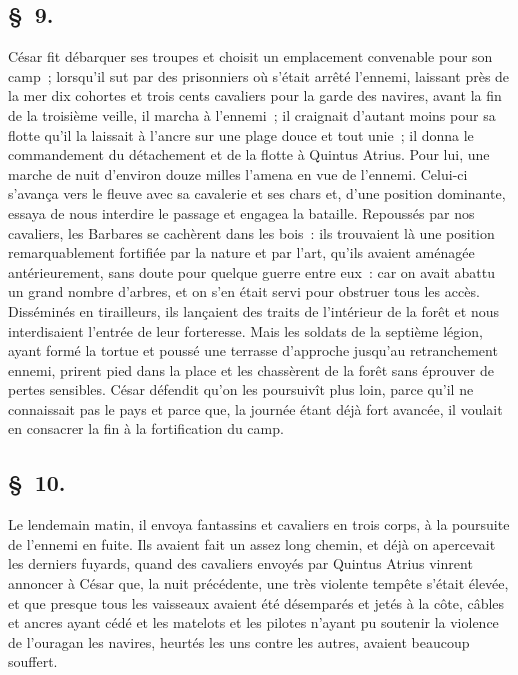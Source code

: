 \documentclass[french,twoside]{book} %
\begin{document}
\subsection[{§ 9.}]{ \textsc{§ 9.} }
\noindent César fit débarquer ses troupes et choisit un emplacement convenable pour son camp ; lorsqu’il sut par des prisonniers où s’était arrêté l’ennemi, laissant près de la mer dix cohortes et trois cents cavaliers pour la garde des navires, avant la fin de la troisième veille, il marcha à l’ennemi ; il craignait d’autant moins pour sa flotte qu’il la laissait à l’ancre sur une plage douce et tout unie ; il donna le commandement du détachement et de la flotte à Quintus Atrius. Pour lui, une marche de nuit d’environ douze milles l’amena en vue de l’ennemi. Celui-ci s’avança vers le fleuve avec sa cavalerie et ses chars et, d’une position dominante, essaya de nous interdire le passage et engagea la bataille. Repoussés par nos cavaliers, les Barbares se cachèrent dans les bois : ils trouvaient là une position remarquablement fortifiée par la nature et par l’art, qu’ils avaient aménagée antérieurement, sans doute pour quelque guerre entre eux : car on avait abattu un grand nombre d’arbres, et on s’en était servi pour obstruer tous les accès. Disséminés en tirailleurs, ils lançaient des traits de l’intérieur de la forêt et nous interdisaient l’entrée de leur forteresse. Mais les soldats de la septième légion, ayant formé la tortue et poussé une terrasse d’approche jusqu’au retranchement ennemi, prirent pied dans la place et les chassèrent de la forêt sans éprouver de pertes sensibles. César défendit qu’on les poursuivît plus loin, parce qu’il ne connaissait pas le pays et parce que, la journée étant déjà fort avancée, il voulait en consacrer la fin à la fortification du camp.
\subsection[{§ 10.}]{ \textsc{§ 10.} }
\noindent Le lendemain matin, il envoya fantassins et cavaliers en trois corps, à la poursuite de l’ennemi en fuite. Ils avaient fait un assez long chemin, et déjà on apercevait les derniers fuyards, quand des cavaliers envoyés par Quintus Atrius vinrent annoncer à César que, la nuit précédente, une très violente tempête s’était élevée, et que presque tous les vaisseaux avaient été désemparés et jetés à la côte, câbles et ancres ayant cédé et les matelots et les pilotes n’ayant pu soutenir la violence de l’ouragan les navires, heurtés les uns contre les autres, avaient beaucoup souffert.
\end{document}
